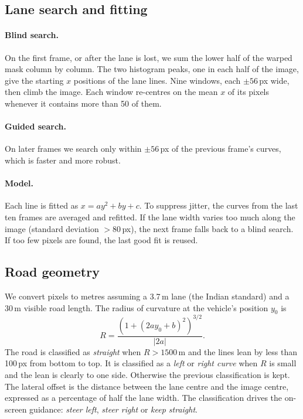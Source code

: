 \documentclass[11pt,a4paper]{article}
\begin{document}
\subsection{Lane search and fitting}
\paragraph{Blind search.} On the first frame, or after the lane is lost, we sum the lower
half of the warped mask column by column. The two histogram peaks, one in each half of the
image, give the starting $x$ positions of the lane lines. Nine windows, each
$\pm56$\,px wide, then climb the image. Each window re-centres on the mean $x$ of its
pixels whenever it contains more than 50 of them.

\paragraph{Guided search.} On later frames we search only within $\pm56$\,px of the
previous frame's curves, which is faster and more robust.

\paragraph{Model.} Each line is fitted as $x = ay^2 + by + c$. To suppress jitter, the
curves from the last ten frames are averaged and refitted. If the lane width varies too
much along the image (standard deviation $>80$\,px), the next frame falls back to a blind
search. If too few pixels are found, the last good fit is reused.

\subsection{Road geometry}
We convert pixels to metres assuming a 3.7\,m lane (the Indian standard) and a 30\,m
visible road length. The radius of curvature at the vehicle's position $y_0$ is
\begin{equation}
  R = \frac{\left(1 + (2ay_0 + b)^2\right)^{3/2}}{|2a|}.
\end{equation}
The road is classified as \emph{straight} when $R>1500$\,m and the lines lean by less than
100\,px from bottom to top. It is classified as a \emph{left} or \emph{right curve} when
$R$ is small and the lean is clearly to one side. Otherwise the previous classification is
kept. The lateral offset is the distance between the lane centre and the image centre,
expressed as a percentage of half the lane width. The classification drives the on-screen
guidance: \emph{steer left}, \emph{steer right} or \emph{keep straight}.
\end{document}
